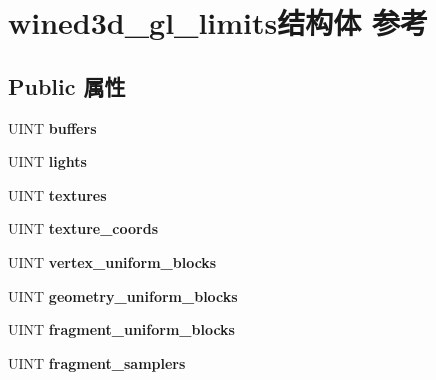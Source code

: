 \hypertarget{structwined3d__gl__limits}{}\section{wined3d\+\_\+gl\+\_\+limits结构体 参考}
\label{structwined3d__gl__limits}
\subsection*{Public 属性}
\begin{DoxyCompactItemize}
\item 
\mbox{\label{structwined3d__gl__limits_a049311d01295eb8bcbd47d1c1e2d697d}} 
U\+I\+NT {\bfseries buffers}
\item 
\mbox{\label{structwined3d__gl__limits_a0ef0d3bc941f1573e5bb7b3c1c3848ad}} 
U\+I\+NT {\bfseries lights}
\item 
\mbox{\label{structwined3d__gl__limits_a492d9ffdbbd5ad99bf278b458ada1c8b}} 
U\+I\+NT {\bfseries textures}
\item 
\mbox{\label{structwined3d__gl__limits_a8102d81a453d292484e2b35b8cbffa16}} 
U\+I\+NT {\bfseries texture\+\_\+coords}
\item 
\mbox{\label{structwined3d__gl__limits_a24de0a273472ecf21f2d1d744b6a4f80}} 
U\+I\+NT {\bfseries vertex\+\_\+uniform\+\_\+blocks}
\item 
\mbox{\label{structwined3d__gl__limits_acec5f6961f3a75aa57e6258cdbaf75ad}} 
U\+I\+NT {\bfseries geometry\+\_\+uniform\+\_\+blocks}
\item 
\mbox{\label{structwined3d__gl__limits_a0b300192a2feec127eb086ea339663c4}} 
U\+I\+NT {\bfseries fragment\+\_\+uniform\+\_\+blocks}
\item 
\mbox{\label{structwined3d__gl__limits_a9d76a4d335d8722b22a9af65943de663}} 
U\+I\+NT {\bfseries fragment\+\_\+samplers}
\item 
\mbox{\label{structwined3d__gl__limits_a346029be3293a81a3121966a6f93bdc3}} 

\end{DoxyCompactItemize}
